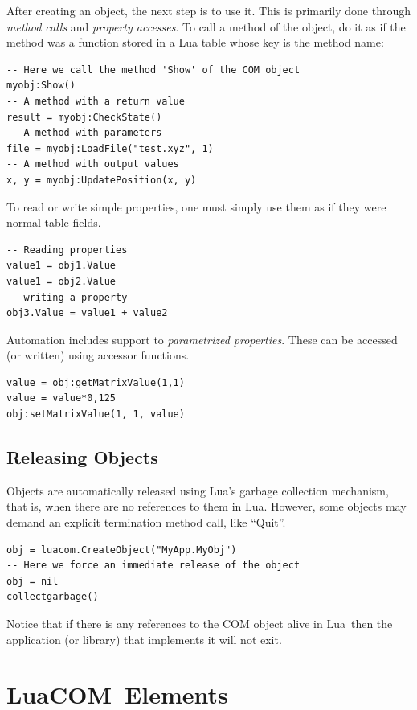 \documentclass[11pt,a4paper,english]{report}
\newcommand{\techname}[1]{\mbox{#1}}
\newcommand{\lua}{\techname{Lua}}
\newcommand{\luacom}{\techname{LuaCOM}}
\begin{document}
After creating an object, the next step is to use it. This is
primarily done through \emph{method calls} and \emph{property
accesses}. To call a method of the object, do it as if the method was
a function stored in a Lua table whose key is the method name:

\begin{verbatim}
-- Here we call the method 'Show' of the COM object
myobj:Show()
-- A method with a return value
result = myobj:CheckState()
-- A method with parameters
file = myobj:LoadFile("test.xyz", 1)
-- A method with output values
x, y = myobj:UpdatePosition(x, y)
\end{verbatim}

To read or write simple properties, one must simply use them as if
they were normal table fields.

\begin{verbatim}
-- Reading properties
value1 = obj1.Value
value1 = obj2.Value
-- writing a property
obj3.Value = value1 + value2
\end{verbatim}

Automation includes support to \emph{parametrized properties}. These
can be accessed (or written) using accessor functions.

\begin{verbatim}
value = obj:getMatrixValue(1,1)
value = value*0,125
obj:setMatrixValue(1, 1, value)
\end{verbatim}



\section{Releasing Objects}
Objects are automatically released using Lua's garbage collection
mechanism, that is, when there are no references to them in
Lua. However, some objects may demand an explicit termination method
call, like ``Quit''.

\begin{verbatim}
obj = luacom.CreateObject("MyApp.MyObj")
-- Here we force an immediate release of the object
obj = nil
collectgarbage()
\end{verbatim}

Notice that if there is any references to the COM object alive in
\lua\, then the application (or library) that implements it will not
exit.



\chapter{\luacom\ Elements}
\end{document}
